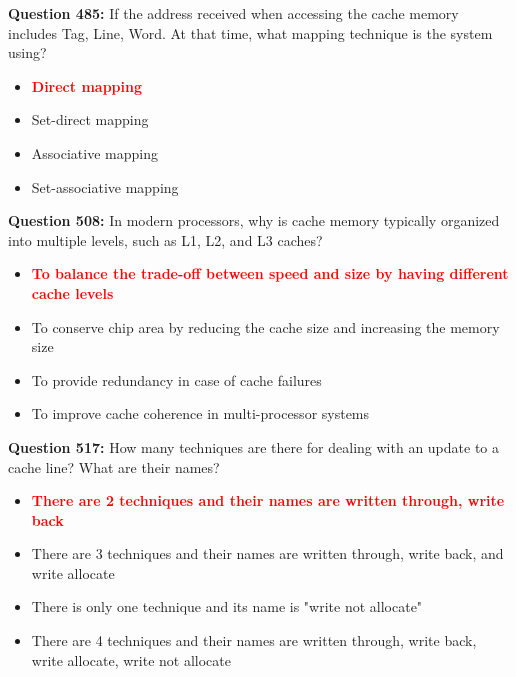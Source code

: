 \documentclass[12pt,a4paper]{article}
\begin{document}
\vspace{0.5cm}

\vspace{0.5cm}

\vspace{0.5cm}

\vspace{0.5cm}

\textbf{Question 485:} If the address received when accessing the cache memory includes Tag, Line, Word. At that time, what mapping technique is the system using?

\begin{itemize}
    \item[\textbf{A.}] \textcolor{red}{\textbf{Direct mapping}}
    \item[\textbf{B.}] Set-direct mapping
    \item[\textbf{C.}] Associative mapping
    \item[\textbf{D.}] Set-associative mapping
\end{itemize}

\vspace{0.5cm}

\vspace{0.5cm}

\textbf{Question 508:} In modern processors, why is cache memory typically organized into multiple levels, such as L1, L2, and L3 caches?

\begin{itemize}
    \item[\textbf{A.}] \textcolor{red}{\textbf{To balance the trade-off between speed and size by having different cache levels}}
    \item[\textbf{B.}] To conserve chip area by reducing the cache size and increasing the memory size
    \item[\textbf{C.}] To provide redundancy in case of cache failures
    \item[\textbf{D.}] To improve cache coherence in multi-processor systems
\end{itemize}

\vspace{0.5cm}

\vspace{0.5cm}

\textbf{Question 517:} How many techniques are there for dealing with an update to a cache line? What are their names?

\begin{itemize}
    \item[\textbf{A.}] \textcolor{red}{\textbf{There are 2 techniques and their names are written through, write back}}
    \item[\textbf{B.}] There are 3 techniques and their names are written through, write back, and write allocate
    \item[\textbf{C.}] There is only one technique and its name is "write not allocate"
    \item[\textbf{D.}] There are 4 techniques and their names are written through, write back, write allocate, write not allocate
\end{itemize}
\end{document}
